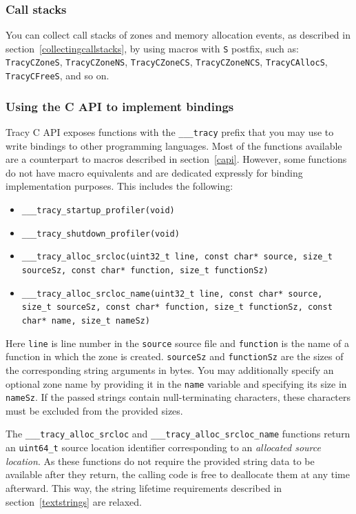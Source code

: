 \documentclass[hidelinks,titlepage,a4paper,twoside]{article}
\begin{document}
\subsubsection{Call stacks}

You can collect call stacks of zones and memory allocation events, as described in section~\ref{collectingcallstacks}, by using macros with \texttt{S} postfix, such as: \texttt{TracyCZoneS}, \texttt{TracyCZoneNS}, \texttt{TracyCZoneCS}, \texttt{TracyCZoneNCS}, \texttt{TracyCAllocS}, \texttt{TracyCFreeS}, and so on.

\subsubsection{Using the C API to implement bindings}
\label{capibindings}

Tracy C API exposes functions with the \texttt{\_\_\_tracy} prefix that you may use to write bindings to other programming languages. Most of the functions available are a counterpart to macros described in section~\ref{capi}. However, some functions do not have macro equivalents and are dedicated expressly for binding implementation purposes. This includes the following:

\begin{itemize}
\item \texttt{\_\_\_tracy\_startup\_profiler(void)}
\item \texttt{\_\_\_tracy\_shutdown\_profiler(void)}
\item \texttt{\_\_\_tracy\_alloc\_srcloc(uint32\_t line, const char* source, size\_t sourceSz, const char* function, size\_t functionSz)}
\item \texttt{\_\_\_tracy\_alloc\_srcloc\_name(uint32\_t line, const char* source, size\_t sourceSz, const char* function, size\_t functionSz, const char* name, size\_t nameSz)}
\end{itemize}

Here \texttt{line} is line number in the \texttt{source} source file and \texttt{function} is the name of a function in which the zone is created. \texttt{sourceSz} and \texttt{functionSz} are the sizes of the corresponding string arguments in bytes. You may additionally specify an optional zone name by providing it in the \texttt{name} variable and specifying its size in \texttt{nameSz}. If the passed strings contain null-terminating characters, these characters must be excluded from the provided sizes.

The \texttt{\_\_\_tracy\_alloc\_srcloc} and \texttt{\_\_\_tracy\_alloc\_srcloc\_name} functions
return an \texttt{uint64\_t} source location identifier corresponding to an \emph{allocated source
location}. As these functions do not require the provided string data to be available after they
return, the calling code is free to deallocate them at any time afterward. This way, the string
lifetime requirements described in section~\ref{textstrings} are relaxed.
\end{document}
